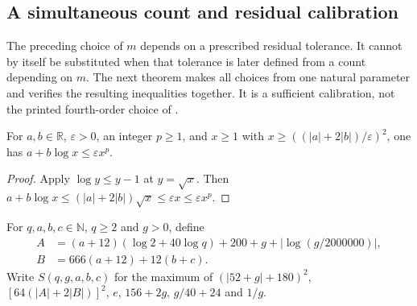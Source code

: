 \subsection{A simultaneous count and residual calibration}

The preceding choice of $m$ depends on a prescribed residual tolerance.
It cannot by itself be substituted when that tolerance is later defined
from a count depending on $m$. The next theorem makes all choices from
one natural parameter and verifies the resulting inequalities together.
It is a sufficient calibration, not the printed fourth-order choice of
\cite[lines 1373--1420]{Arad2016RigorousRG}.

\begin{lemma}
    \label{lem:soft_affine_log_threshold}
    \leanok
    For $a,b\in\mathbb R$, $\varepsilon>0$, an integer $p\ge1$, and
    $x\ge1$ with $x\ge((|a|+2|b|)/\varepsilon)^2$,
    one has $a+b\log x\le\varepsilon x^p$.
\end{lemma}
\begin{proof}\leanok
    Apply $\log y\le y-1$ at $y=\sqrt x$. Then
    $a+b\log x\le (|a|+2|b|)\sqrt x\le\varepsilon x\le\varepsilon x^p$.
\end{proof}

\begin{definition}
    \label{def:soft_family_threshold}
    \leanok
    For $q,a,b,c\in\mathbb N$, $q\ge2$ and $g>0$, define
    \begin{align}
        A &= (a+12)(\log 2+40\log q)+200+g+|\log(g/2000000)|,
            \label{eq:soft_threshold_affine_constant}\\
        B &= 666(a+12)+12(b+c). \label{eq:soft_threshold_affine_slope}
    \end{align}
    Write $S(q,g,a,b,c)$ for the maximum of
    $(|52+g|+180)^2$, $[64(|A|+2|B|)]^2$, $e$, $156+2g$,
    $g/40+24$ and $1/g$.
\end{definition}

